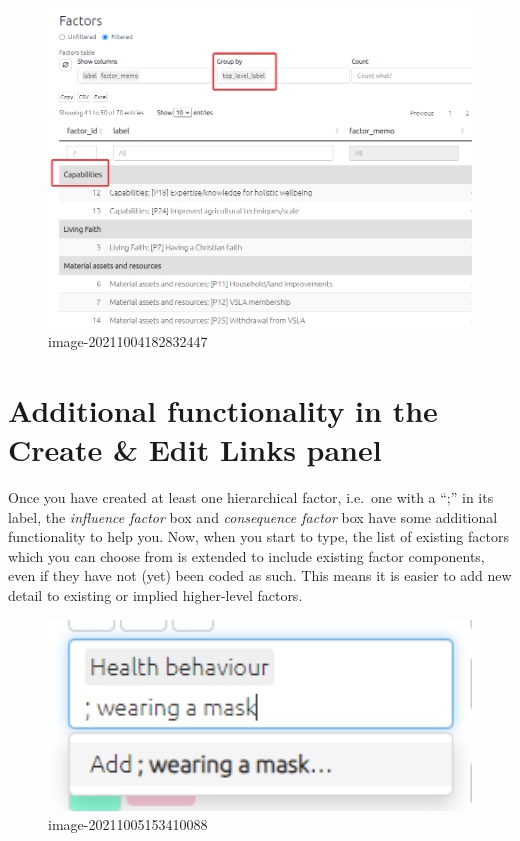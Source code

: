 \documentclass[
]{book}
\begin{document}
\begin{figure}
\centering
\includegraphics[width=6.77083in,height=\textheight]{_assets/image-20211004182832447.png}
\caption{image-20211004182832447}
\end{figure}

\hypertarget{additional-functionality-in-the-create-edit-links-panel}{%
\section{Additional functionality in the Create \& Edit Links panel}\label{additional-functionality-in-the-create-edit-links-panel}}

Once you have created at least one hierarchical factor, i.e.~one with a ``;'' in its label, the \emph{influence factor} box and \emph{consequence factor} box have some additional functionality to help you. Now, when you start to type, the list of existing factors which you can choose from is extended to include existing factor components, even if they have not (yet) been coded as such. This means it is easier to add new detail to existing or implied higher-level factors.

\begin{figure}
\centering
\includegraphics[width=6.77083in,height=\textheight]{_assets/image-20211005153410088.png}
\caption{image-20211005153410088}
\end{figure}
\end{document}
